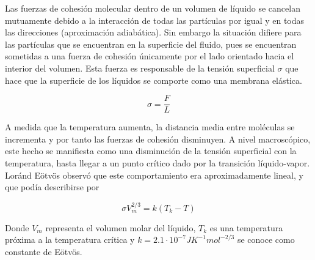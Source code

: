 Las fuerzas de cohesión molecular dentro de un volumen de líquido se cancelan mutuamente debido a la interacción de todas las partículas por igual y en todas las direcciones (aproximación adiabática). Sin embargo la situación difiere para las partículas que se encuentran en la superficie del fluido, pues se encuentran sometidas a una fuerza de cohesión únicamente por el lado orientado hacia el interior del volumen. Esta fuerza es responsable de la tensión superficial $\sigma$ que hace que la superficie de los líquidos se comporte como una membrana elástica.

\begin{equation}
	\sigma = \frac{F}{L} \label{eq_tension}
\end{equation}

A medida que la temperatura aumenta, la distancia media entre moléculas se incrementa y por tanto las fuerzas de cohesión disminuyen. A nivel macroscópico, este hecho se manifiesta como una disminución de la tensión superficial con la temperatura, hasta llegar a un punto crítico dado por la transición líquido-vapor. Loránd Eötvös observó que este comportamiento era aproximadamente lineal, y que podía describirse por

\begin{equation}
	\sigma V_{m}^{2/3} = k \left( T_k - T \right) \label{eq_eotvos}
\end{equation}

Donde $V_m$ representa el volumen molar del líquido, $T_k$ es una temperatura próxima a la temperatura crítica y $k = 2.1 \cdot 10^{-7}JK^{-1}mol^{-2/3}$ se conoce como constante de Eötvös.